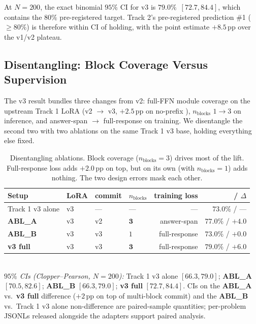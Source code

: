 At $N{=}200$, the exact binomial $95\%$ CI for v3 \ctwoc{} is
$79.0\%$~\mbox{$[72.7, 84.4]$}, which contains the $80\%$
pre-registered target.  Track 2's pre-registered prediction \#1
(\ctwoc{} $\geq 80\%$) is therefore within CI of holding, with the
point estimate $+8.5$\,pp over the v1/v2 plateau.

\subsection{Disentangling: Block Coverage Versus Supervision}
\label{subsec:distill_ablations}

The v3 result bundles three changes from v2: full-FFN module
coverage on the upstream Track 1 LoRA (v2 $\to$ v3,
$+2.5$\,pp on no-prefix \ctwo{}), $n_\text{blocks}$ $1 \to 3$ on
inference, and answer-span $\to$ full-response on training.
We disentangle the second two with two ablations on the same
Track 1 v3 base, holding everything else fixed.

\begin{table}[h]
\centering
\caption{Disentangling ablations.  Block coverage
($n_\text{blocks}{=}3$) drives most of the lift.  Full-response
loss adds $+2.0$\,pp on top, but on its own (with
$n_\text{blocks}{=}1$) adds nothing.  The two design errors mask
each other.}
\label{tab:distill_disentangle}
\smallskip
\begin{tabular}{llllrr}
\toprule
Setup & LoRA & commit & $n_\text{blocks}$ & training loss & \ctwoc{} / $\Delta$ \\
\midrule
Track 1 v3 alone & v3 & --- & --- & --- & $73.0\%$ / --- \\
\textbf{ABL\_A} & v3 & v2 & $\mathbf{3}$ & answer-span & $\mathbf{77.0\%}$ / $\mathbf{+4.0}$ \\
\textbf{ABL\_B} & v3 & v3 & $1$ & full-response & $73.0\%$ / $+0.0$ \\
\textbf{v3 full} & v3 & v3 & $\mathbf{3}$ & full-response & $\mathbf{79.0\%}$ / $\mathbf{+6.0}$ \\
\bottomrule
\end{tabular}
\smallskip\\
{\footnotesize\textit{$95\%$ CIs (Clopper--Pearson, $N{=}200$):}
Track 1 v3 alone \mbox{$[66.3, 79.0]$};
\textbf{ABL\_A} \mbox{$[70.5, 82.6]$};
\textbf{ABL\_B} \mbox{$[66.3, 79.0]$};
\textbf{v3 full} \mbox{$[72.7, 84.4]$}.  CIs on the
\textbf{ABL\_A} vs.\ \textbf{v3 full} difference ($+2$\,pp on
top of multi-block commit) and the \textbf{ABL\_B} vs.\ Track 1
v3 alone non-difference are paired-sample quantities; per-problem
JSONLs released alongside the adapters support paired analysis.}
\end{table}

